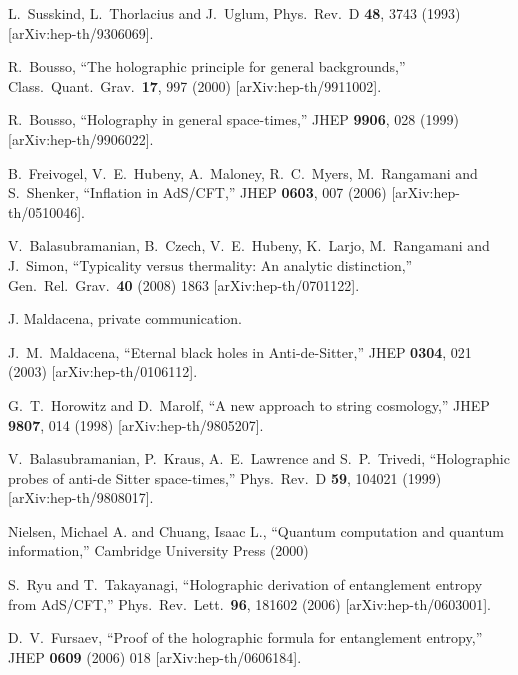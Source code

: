 \documentclass[12pt,epsf]{article}
\renewcommand{\(}{\left(}
\renewcommand{\)}{\right)}
\begin{document}
\begin{thebibliography}{999}
  L.~Susskind, L.~Thorlacius and J.~Uglum,
  Phys.\ Rev.\  D {\bf 48}, 3743 (1993)
  [arXiv:hep-th/9306069].

  R.~Bousso,
  ``The holographic principle for general backgrounds,''
  Class.\ Quant.\ Grav.\  {\bf 17}, 997 (2000)
  [arXiv:hep-th/9911002].

  R.~Bousso,
  ``Holography in general space-times,''
  JHEP {\bf 9906}, 028 (1999)
  [arXiv:hep-th/9906022].

  B.~Freivogel, V.~E.~Hubeny, A.~Maloney, R.~C.~Myers, M.~Rangamani and S.~Shenker,
  ``Inflation in AdS/CFT,''
  JHEP {\bf 0603}, 007 (2006)
  [arXiv:hep-th/0510046].

  V.~Balasubramanian, B.~Czech, V.~E.~Hubeny, K.~Larjo, M.~Rangamani and J.~Simon,
  ``Typicality versus thermality: An analytic distinction,''
  Gen.\ Rel.\ Grav.\  {\bf 40} (2008) 1863
  [arXiv:hep-th/0701122].

  J. Maldacena, private communication.

  J.~M.~Maldacena,
  ``Eternal black holes in Anti-de-Sitter,''
  JHEP {\bf 0304}, 021 (2003)
  [arXiv:hep-th/0106112].

  G.~T.~Horowitz and D.~Marolf,
  ``A new approach to string cosmology,''
  JHEP {\bf 9807}, 014 (1998)
  [arXiv:hep-th/9805207].

  V.~Balasubramanian, P.~Kraus, A.~E.~Lawrence and S.~P.~Trivedi,
  ``Holographic probes of anti-de Sitter space-times,''
  Phys.\ Rev.\  D {\bf 59}, 104021 (1999)
  [arXiv:hep-th/9808017].

Nielsen, Michael A. and Chuang, Isaac L.,
``Quantum computation and quantum information,''
Cambridge University Press (2000)

  S.~Ryu and T.~Takayanagi,
  ``Holographic derivation of entanglement entropy from AdS/CFT,''
  Phys.\ Rev.\ Lett.\  {\bf 96}, 181602 (2006)
  [arXiv:hep-th/0603001].

  D.~V.~Fursaev,
  ``Proof of the holographic formula for entanglement entropy,''
  JHEP {\bf 0609} (2006) 018
  [arXiv:hep-th/0606184].



\end{thebibliography}
\end{document}

